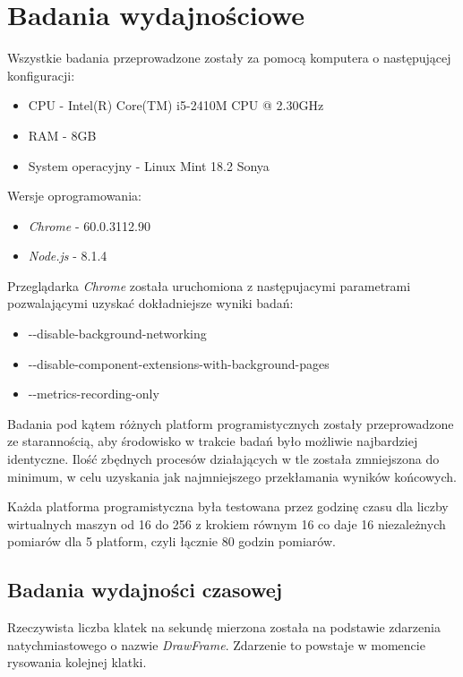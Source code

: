 \documentclass[polish, twoside, 12pt]{mwart}
\let\stdsection\section
\renewcommand*{\section}{\clearpage\stdsection}
\begin{document}
\section{Badania wydajnościowe}

Wszystkie badania przeprowadzone zostały za pomocą komputera o następującej konfiguracji:

\begin{itemize}
  \item CPU - Intel(R) Core(TM) i5-2410M CPU @ 2.30GHz
  \item RAM - 8GB
  \item System operacyjny - Linux Mint 18.2 Sonya
\end{itemize}

Wersje oprogramowania:

\begin{itemize}
  \item \emph{Chrome} - 60.0.3112.90
  \item \emph{Node.js} - 8.1.4
\end{itemize}

Przeglądarka \emph{Chrome} została uruchomiona z następujacymi parametrami pozwalającymi uzyskać dokładniejsze wyniki badań:

\begin{itemize}
  \item -{}-disable-background-networking
  \item -{}-disable-component-extensions-with-background-pages
  \item -{}-metrics-recording-only
\end{itemize}

Badania pod kątem różnych platform programistycznych zostały przeprowadzone ze starannością, aby środowisko w trakcie badań było możliwie najbardziej identyczne. Ilość zbędnych procesów działających w tle została zmniejszona do minimum, w celu uzyskania jak najmniejszego przekłamania wyników końcowych.

Każda platforma programistyczna była testowana przez godzinę czasu dla liczby wirtualnych maszyn od 16 do 256 z krokiem równym 16 co daje 16 niezależnych pomiarów dla 5 platform, czyli łącznie 80 godzin pomiarów.

\subsection{Badania wydajności czasowej}

Rzeczywista liczba klatek na sekundę mierzona została na podstawie zdarzenia natychmiastowego o nazwie \emph{DrawFrame}. Zdarzenie to powstaje w momencie rysowania kolejnej klatki.
\end{document}
